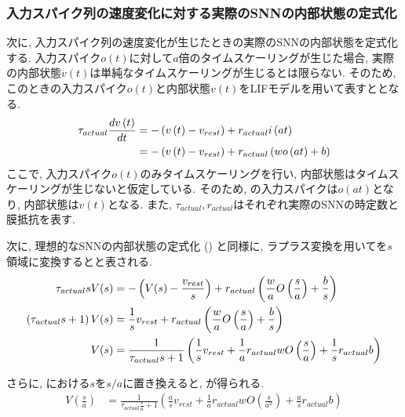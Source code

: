 \subsubsection{入力スパイク列の速度変化に対する実際のSNNの内部状態の定式化}
次に, 入力スパイク列の速度変化が生じたときの実際のSNNの内部状態を定式化する.
入力スパイク$o(t)$に対して$a$倍のタイムスケーリングが生じた場合, 実際の内部状態$v(t)$は単純なタイムスケーリングが生じるとは限らない.
そのため, このときの入力スパイク$o(t)$と内部状態$v(t)$をLIFモデルを用いて表すととなる.
\begin{align}
    \tau_{actual} \frac{dv\left(t\right)}{dt} &= -\left(v\left(t\right) - v_{rest}\right) + r_{actual} i\left(at\right) \notag \\
     &= -\left(v\left(t\right) - v_{rest}\right) + r_{actual} \left( wo\left(at\right) + b \right) \label{eq:actual:state}
\end{align}
ここで, 入力スパイク$o(t)$のみタイムスケーリングを行い, 内部状態はタイムスケーリングが生じないと仮定している.
そのため, の入力スパイクは$o(at)$となり, 内部状態は$v(t)$となる.
また, $\tau_{actual}, r_{actual}$はそれぞれ実際のSNNの時定数と膜抵抗を表す.

次に, 理想的なSNNの内部状態の定式化 () と同様に, ラプラス変換を用いてを$s$領域に変換するとと表される.
\begin{align}
    \tau_{actual} sV(s) &= - \left( V(s) - \frac{v_{rest}}{s} \right) + r_{actual} \left( \frac{w}{a} O\left(\frac{s}{a}\right) + \frac{b}{s} \right) \notag \\
    \left(\tau_{actual} s +1\right) V(s) &= \frac{1}{s} v_{rest} +r_{actual} \left( \frac{w}{a} O\left(\frac{s}{a}\right) + \frac{b}{s} \right) \notag \\
    V(s) &=  \frac{1}{\tau_{actual} s +1}\left( \frac{1}{s} v_{rest} +\frac{1}{a} r_{actual} w O\left(\frac{s}{a}\right) + \frac{1}{s} r_{actual} b \right) \label{eq:actual:state:laplace}
\end{align}

さらに, における$s$を$s/a$に置き換えると, が得られる.
\begin{align}
    V\left(\frac{s}{a}\right) &=  \frac{1}{\tau_{actual} \frac{s}{a} +1}\left( \frac{a}{s} v_{rest} +\frac{1}{a} r_{actual} w O\left(\frac{s}{a^2}\right) + \frac{a}{s} r_{actual} b \right) \label{eq:actual:state:laplace2}
\end{align}


